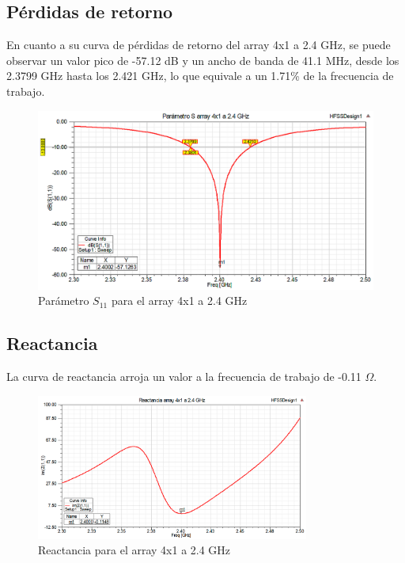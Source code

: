 \subsection{Pérdidas de retorno}
\par En cuanto a su curva de pérdidas de retorno del array 4x1 a 2.4 GHz, se puede observar un valor pico de -57.12 dB y un ancho de banda de 41.1 MHz, desde los 2.3799 GHz hasta los 2.421 GHz, lo que equivale a un 1.71\% de la frecuencia de trabajo.
\\
\begin{figure}[H]
    \centering
        \includegraphics[width=\textwidth]{archivos/analisis/4x11/1}
        \caption{Parámetro $S_{11}$ para el array 4x1 a 2.4 GHz}
        \label{fig:s4x11}
\end{figure}

\newpage
\subsection{Reactancia}
\par La curva de reactancia arroja un valor a la frecuencia de trabajo de -0.11 $\Omega$. 
\\
\begin{figure}[H]
    \centering
        \includegraphics[width=0.8\textwidth]{archivos/analisis/4x11/2}
        \caption{Reactancia para el array 4x1 a 2.4 GHz}
        \label{fig:react4x11}
\end{figure}

